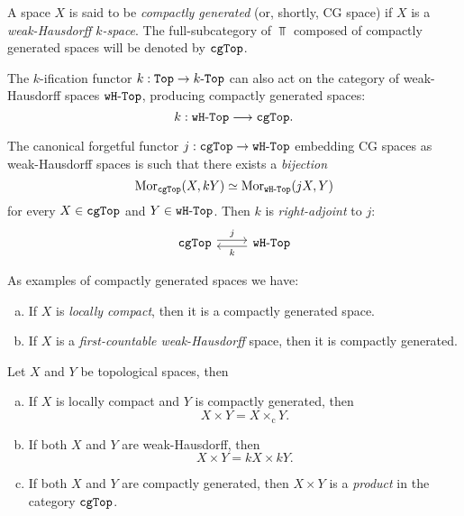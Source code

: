 \begin{definition}
\label{def:compactly-generated}
A space \(X\) is said to be \emph{compactly generated} (or, shortly, CG space)
if \(X\) is a \emph{weak-Hausdorff \(k\)-space}. The full-subcategory of
\(\Top\) composed of compactly generated spaces will be denoted by \({\texttt{cgTop}}\).
\end{definition}

The \(k\)-ification functor \(k: {\texttt{Top}} \to {k\text{-}\texttt{Top}}\) can also act on the category
of weak-Hausdorff spaces \({\texttt{wH}\text{-}\texttt{Top}}\), producing compactly generated spaces:
\[
k: {\texttt{wH}\text{-}\texttt{Top}} \longrightarrow {\texttt{cgTop}}.
\]

\begin{lemma}
\label{lem:cgTop-and-wHTop}
The canonical forgetful functor \(j: {\texttt{cgTop}} \to {\texttt{wH}\text{-}\texttt{Top}}\) embedding CG
spaces as weak-Hausdorff spaces is such that there exists a \emph{bijection}
\[
\operatorname{Mor}_{{\texttt{cgTop}}}(X, k Y) \simeq \operatorname{Mor}_{{\texttt{wH}\text{-}\texttt{Top}}}(j X, Y)
\]
for every \(X \in {\texttt{cgTop}}\) and \(Y \in {\texttt{wH}\text{-}\texttt{Top}}\). Then \(k\) is
\emph{right-adjoint} to \(j\):
\[
\begin{tikzcd}
\cgTop \ar[r, shift left, "j"]
&\wHTop \ar[l, shift left, "k"]
\end{tikzcd}
\]
\end{lemma}

\begin{example}
\label{exp:compactly-generated-fst-ctbl-lcly-cpct-and-wk-haus}
As examples of compactly generated spaces we have:
\begin{enumerate}[(a)]\setlength\itemsep{0em}
\item If \(X\) is \emph{locally compact}, then it is a compactly generated
  space.

\item If \(X\) is a \emph{first-countable weak-Hausdorff} space, then it is
  compactly generated.
\end{enumerate}
\end{example}

\begin{lemma}
\label{lem:relations-cartesian-and-k-product}
Let \(X\) and \(Y\) be topological spaces, then
\begin{enumerate}[(a)]\setlength\itemsep{0em}
\item If \(X\) is locally compact and \(Y\) is compactly generated, then
  \[
  X \times Y = X \times_{\text{c}} Y.
  \]
\item If both \(X\) and \(Y\) are weak-Hausdorff, then
  \[
  X \times Y = k X \times k Y.
  \]
\item If both \(X\) and \(Y\) are compactly generated, then \(X \times Y\) is a
  \emph{product} in the category \({\texttt{cgTop}}\).
\end{enumerate}
\end{lemma}

